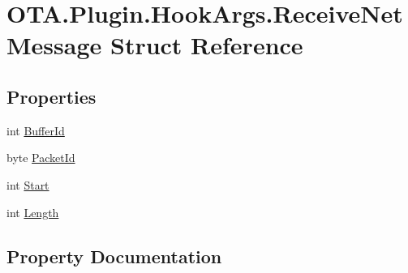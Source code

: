 \hypertarget{struct_o_t_a_1_1_plugin_1_1_hook_args_1_1_receive_net_message}{}\section{O\+T\+A.\+Plugin.\+Hook\+Args.\+Receive\+Net\+Message Struct Reference}
\label{struct_o_t_a_1_1_plugin_1_1_hook_args_1_1_receive_net_message}
\subsection*{Properties}
\begin{DoxyCompactItemize}
\item 
int \hyperlink{struct_o_t_a_1_1_plugin_1_1_hook_args_1_1_receive_net_message_a66ebe469e4335e903ddb7d06f8b2e76c}{Buffer\+Id}
\item 
byte \hyperlink{struct_o_t_a_1_1_plugin_1_1_hook_args_1_1_receive_net_message_a8570b696bfd69e1ec7203cfc2b534578}{Packet\+Id}
\item 
int \hyperlink{struct_o_t_a_1_1_plugin_1_1_hook_args_1_1_receive_net_message_a621ac035dfab0557d8940b3b64b562a3}{Start}
\item 
int \hyperlink{struct_o_t_a_1_1_plugin_1_1_hook_args_1_1_receive_net_message_afa4d4a0f9b939fe979c2afbcb95be62d}{Length}
\end{DoxyCompactItemize}


\subsection{Property Documentation}
\hypertarget{struct_o_t_a_1_1_plugin_1_1_hook_args_1_1_receive_net_message_a66ebe469e4335e903ddb7d06f8b2e76c}{}

